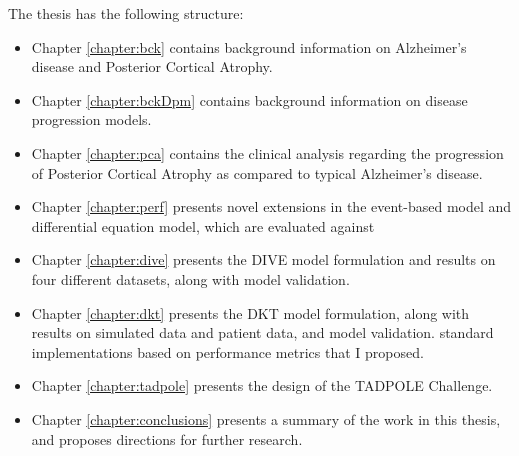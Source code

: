 The thesis has the following structure:
\begin{itemize}
 \item Chapter \ref{chapter:bck} contains background information on Alzheimer's disease and Posterior Cortical Atrophy.
 \item Chapter \ref{chapter:bckDpm} contains background information on disease progression models.
 \item Chapter \ref{chapter:pca} contains the clinical analysis regarding the progression of Posterior Cortical Atrophy as compared to typical Alzheimer's disease. 
  \item Chapter \ref{chapter:perf} presents novel extensions in the event-based model and differential equation model, which are evaluated against
  \item Chapter \ref{chapter:dive} presents the DIVE model formulation and results on four different datasets, along with model validation.
 \item Chapter \ref{chapter:dkt} presents the DKT model formulation, along with results on simulated data and patient data, and model validation.
 standard implementations based on performance metrics that I proposed.
 \item Chapter \ref{chapter:tadpole} presents the design of the TADPOLE Challenge.
 \item Chapter \ref{chapter:conclusions} presents a summary of the work in this thesis, and proposes directions for further research.
 \end{itemize}



